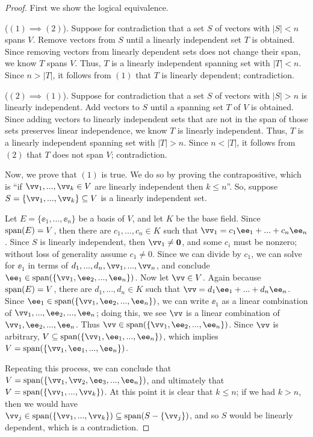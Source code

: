 \begin{proof}
    First we show the logical equivalence.
    
    ($(1) \implies (2)$). Suppose for contradiction that a set $S$ of vectors with $|S| < n$ spans $V$. Remove vectors from $S$ until a linearly independent set $T$ is obtained. Since removing vectors from linearly dependent sets does not change their span, we know $T$ spans $V$. Thus, $T$ is a linearly independent spanning set with $|T| < n$. Since $n > |T|$, it follows from $(1)$ that $T$ is linearly dependent; contradiction.
    
    ($(2) \implies (1)$). Suppose for contradiction that a set $S$ of vectors with $|S| > n$ is linearly independent. Add vectors to $S$ until a spanning set $T$ of $V$ is obtained. Since adding vectors to linearly independent sets that are not in the span of those sets preserves linear independence, we know $T$ is linearly independent. Thus, $T$ is a linearly independent spanning set with $|T| > n$. Since $n < |T|$, it follows from $(2)$ that $T$ does not span $V$; contradiction.

    Now, we prove that $(1)$ is true. We do so by proving the contrapositive, which is ``if $\vv_1, ..., \vv_k \in V$ are linearly independent then $k \leq n$''.  
    So, suppose $S = \{\vv_1, ..., \vv_k\} \subseteq V$ is a linearly independent set.

    Let $E = \{\ee_1, ..., \ee_n\}$ be a basis of $V$, and let $K$ be the base field. Since $\text{span}(E) = V$, then there are $c_1, ..., c_n \in K$ such that ${\vv_1 = c_1 \ee_1 + ... + c_n \ee_n}$. Since $S$ is linearly independent, then $\vv_1 \neq \mathbf{0}$, and some $c_i$ must be nonzero; without loss of generality assume $c_1 \neq 0$. Since we can divide by $c_1$, we can solve for $\ee_1$ in terms of $d_1, ..., d_n, \vv_1, ..., \vv_n$, and conclude $\ee_1 \in \spann(\{\vv_1, \ee_2, ..., \ee_n\})$. Now let $\vv \in V$. Again because $\text{span}(E) = V$, there are $d_1, ..., d_n \in K$ such that $\vv = d_1 \ee_1 + ... + d_n \ee_n$. Since $\ee_1 \in \spann(\{\vv_1, \ee_2, ..., \ee_n\})$, we can write $\ee_1$ as a linear combination of $\vv_1, ..., \ee_2, ..., \ee_n$; doing this, we see $\vv$ is a linear combination of $\vv_1, \ee_2, ..., \ee_n$. Thus $\vv \in \spann(\{\vv_1, \ee_2, ..., \ee_n\})$. Since $\vv$ is arbitrary, $V \subseteq \spann(\{\vv_1, \ee_1, ..., \ee_n\})$, which implies $V = \spann(\{\vv_1, \ee_1, ..., \ee_n\})$.

    Repeating this process, we can conclude that $V = \spann(\{\vv_1, \vv_2, \ee_3, ..., \ee_n\})$, and ultimately that $V = \spann(\{\vv_1, ..., \vv_k\})$. At this point it is clear that $k \leq n$; if we had $k > n$, then we would have \\ ${\vv_j \in \spann(\{\vv_1, ..., \vv_k\}) \subseteq \spann(S - \{\vv_j\})}$, and so $S$ would be linearly dependent, which is a contradiction. 
\end{proof}

